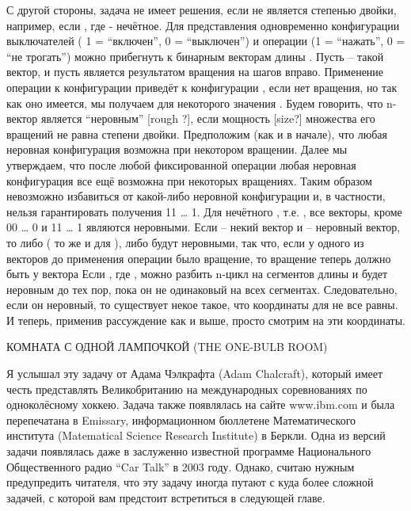   С другой стороны, задача не имеет решения, если  не является степенью двойки, например, если , где  - нечётное. Для представления  одновременно конфигурации выключателей ( 1 = “включен”, 0 = “выключен”) и операции (1 = “нажать”, 0 = “не трогать”) можно прибегнуть к бинарным векторам длины . Пусть -- такой вектор, и пусть  является результатом вращения на шагов вправо. Применение операции  к конфигурации  приведёт к конфигурации , если нет вращения, но так как оно имеется, мы получаем  для некоторого значения .
  Будем говорить, что n-вектор  является “неровным” [rough ?], если мощность [size?] множества его вращений  не равна степени двойки.
Предположим (как и в начале), что любая неровная конфигурация возможна при некотором вращении. Далее мы утверждаем, что после любой фиксированной операции любая неровная конфигурация все ещё возможна при некоторых вращениях. Таким образом невозможно избавиться от какой-либо неровной конфигурации и, в частности, нельзя гарантировать получения 11 … 1.
   Для нечётного , т.е. , все векторы, кроме 00 … 0 и 11 … 1 являются неровными. Если -- некий вектор и   -- неровный вектор, то либо   ( то же и для ), либо будут неровными, так что, если у одного из векторов до применения  операции было вращение, то вращение теперь должно быть у вектора 
   Если  ,  где , можно разбить n-цикл на сегментов длины  и  будет неровным до тех пор, пока он не одинаковый на всех сегментах. Следовательно, если он неровный, то существует некое такое, что координаты    для   не все равны.  И теперь, применив рассуждение как и выше, просто смотрим на эти координаты.






 КОМНАТА С ОДНОЙ ЛАМПОЧКОЙ (THE ONE-BULB ROOM)


   Я услышал эту задачу от Адама Чэлкрафта (Adam Chalcraft), который имеет честь представлять Великобританию на международных соревнованиях по одноколёсному хоккею. Задача также появлялась на сайте www.ibm.com и была перепечатана в Emissary, информационном бюллетене Математического института (Matematical Science Research Institute) в Беркли. Одна из версий задачи появлялась даже в заслуженно известной программе Национального Общественного радио “Car Talk” в 2003 году.
   Однако, считаю нужным предупредить читателя, что эту задачу иногда  путают с куда более сложной задачей, с которой вам предстоит встретиться в следующей главе.


